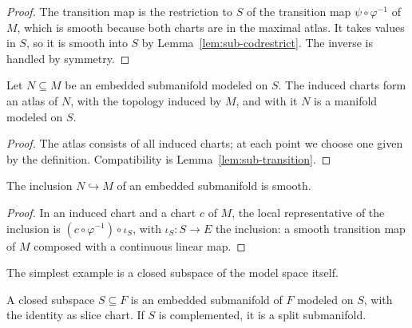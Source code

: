 \begin{proof}
  \leanok
  The transition map is the restriction to $S$ of the transition map $\psi \circ \varphi^{-1}$
  of $M$, which is smooth because both charts are in the maximal atlas. It takes values in
  $S$, so it is smooth into $S$ by Lemma~\ref{lem:sub-codrestrict}. The inverse is handled by
  symmetry.
\end{proof}

\begin{theorem}
  \label{thm:sub-manifold}
  \leanok
  Let $N \subseteq M$ be an embedded submanifold modeled on $S$. The induced charts form an
  atlas of $N$, with the topology induced by $M$, and with it $N$ is a manifold modeled on $S$.
\end{theorem}

\begin{proof}
  \leanok
  The atlas consists of all induced charts; at each point we choose one given by the
  definition. Compatibility is Lemma~\ref{lem:sub-transition}.
\end{proof}

\begin{proposition}
  \label{prop:sub-inclusion-smooth}
  \leanok
  The inclusion $N \hookrightarrow M$ of an embedded submanifold is smooth.
\end{proposition}

\begin{proof}
  \leanok
  In an induced chart and a chart $c$ of $M$, the local representative of the inclusion is
  $(c \circ \varphi^{-1}) \circ \iota_S$, with $\iota_S \colon S \to E$ the inclusion: a smooth
  transition map of $M$ composed with a continuous linear map.
\end{proof}

The simplest example is a closed subspace of the model space itself.

\begin{proposition}
  \label{prop:sub-subspace}
  \leanok
  A closed subspace $S \subseteq F$ is an embedded submanifold of $F$ modeled on $S$, with the
  identity as slice chart. If $S$ is complemented, it is a split submanifold.
\end{proposition}

